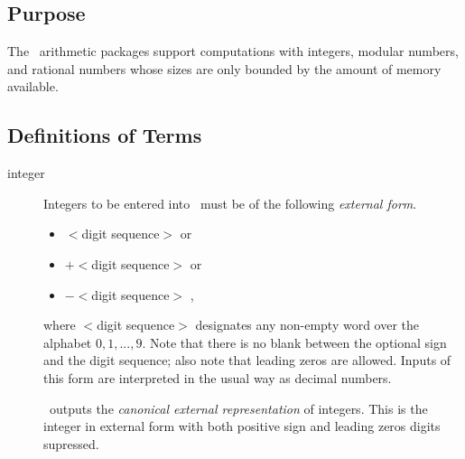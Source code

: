 \subsection{Purpose}
\label{c:A s:I ss:P}

The \saclib\ arithmetic packages support computations with integers,
modular numbers, and rational numbers whose sizes are only bounded by the
amount of memory available.


\subsection{Definitions of Terms}
\label{c:A s:I ss:D}

\begin{description}
\item[integer]
  Integers to be entered into \saclib\ must be of the following
  {\em external form}.
  \begin{itemize}
  \item   $<$digit sequence$>$ or
  \item  $+<$digit sequence$>$ or
  \item  $-<$digit sequence$>$ ,
  \end{itemize}
  where $<$digit sequence$>$ designates any non-empty word over the alphabet
  ${0,1,...,9}$.
  Note that there is no blank between the optional sign and the
  digit sequence; also note that leading zeros are allowed.
  Inputs of this form are interpreted in the usual way as decimal numbers.
  
  \saclib\ outputs the {\em canonical external representation} of integers.
  This is the integer in external form with both positive sign and leading zeros
  digits supressed.


\end{description}
